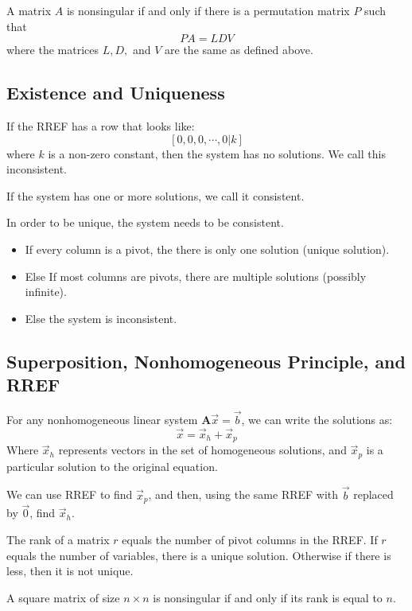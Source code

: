         \begin{thm}
            A matrix $A$ is nonsingular if and only if there is a permutation matrix $P$ such that
            \[
                PA = LDV
            \]
            where the matrices $L, D,$ and $V$ are the same as defined above.
        \end{thm}

    \subsection{Existence and Uniqueness}
    If the RREF has a row that looks like:
    \[
        [0, 0, 0, \cdots, 0 | k]
    \]
    where $k$ is a non-zero constant, then the system has no solutions. We call this inconsistent.

    If the system has one or more solutions, we call it consistent.

    In order to be unique, the system needs to be consistent.
        \begin{itemize}
            \item If every column is a pivot, the there is only one solution (unique solution).
            \item Else If most columns are pivots, there are multiple solutions (possibly infinite).
            \item Else the system is inconsistent.
        \end{itemize}

    \subsection{Superposition, Nonhomogeneous Principle, and RREF}
    For any nonhomogeneous linear system $\mathbf{A}\vec{x} = \vec{b}$, we can write the solutions as:
    \[
        \vec{x} = \vec{x}_h + \vec{x}_p
    \]
    Where $\vec{x}_h$ represents vectors in the set of homogeneous solutions, and $\vec{x}_p$ is a particular solution to the original equation.

    We can use RREF to find $\vec{x}_p$, and then, using the same RREF with $\vec{b}$ replaced by $\vec{0}$, find $\vec{x}_h$.

    The rank of a matrix $r$ equals the number of pivot columns in the RREF. If $r$ equals the number of variables, there is a unique solution. Otherwise if there is less, then it is not unique.

    \begin{definition}
        A square matrix of size $n \times n$ is nonsingular if and only if its rank is equal to $n$.
    \end{definition}

